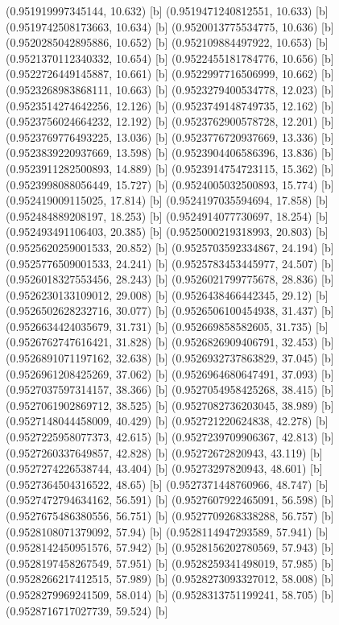 {{{(0.951919997345144, 10.632) [b] 
(0.9519471240812551, 10.633) [b] 
(0.9519742508173663, 10.634) [b] 
(0.9520013775534775, 10.636) [b] 
(0.9520285042895886, 10.652) [b] 
(0.952109884497922, 10.653) [b] 
(0.9521370112340332, 10.654) [b] 
(0.9522455181784776, 10.656) [b] 
(0.9522726449145887, 10.661) [b] 
(0.9522997716506999, 10.662) [b] 
(0.9523268983868111, 10.663) [b] 
(0.9523279400534778, 12.023) [b] 
(0.9523514274642256, 12.126) [b] 
(0.9523749148749735, 12.162) [b] 
(0.9523756024664232, 12.192) [b] 
(0.9523762900578728, 12.201) [b] 
(0.9523769776493225, 13.036) [b] 
(0.9523776720937669, 13.336) [b] 
(0.9523839220937669, 13.598) [b] 
(0.9523904406586396, 13.836) [b] 
(0.9523911282500893, 14.889) [b] 
(0.9523914754723115, 15.362) [b] 
(0.9523998088056449, 15.727) [b] 
(0.9524005032500893, 15.774) [b] 
(0.952419009115025, 17.814) [b] 
(0.9524197035594694, 17.858) [b] 
(0.952484889208197, 18.253) [b] 
(0.9524914077730697, 18.254) [b] 
(0.952493491106403, 20.385) [b] 
(0.9525000219318993, 20.803) [b] 
(0.9525620259001533, 20.852) [b] 
(0.9525703592334867, 24.194) [b] 
(0.9525776509001533, 24.241) [b] 
(0.9525783453445977, 24.507) [b] 
(0.9526018327553456, 28.243) [b] 
(0.9526021799775678, 28.836) [b] 
(0.9526230133109012, 29.008) [b] 
(0.9526438466442345, 29.12) [b] 
(0.9526502628232716, 30.077) [b] 
(0.9526506100454938, 31.437) [b] 
(0.9526634424035679, 31.731) [b] 
(0.952669858582605, 31.735) [b] 
(0.9526762747616421, 31.828) [b] 
(0.9526826909406791, 32.453) [b] 
(0.9526891071197162, 32.638) [b] 
(0.9526932737863829, 37.045) [b] 
(0.9526961208425269, 37.062) [b] 
(0.9526964680647491, 37.093) [b] 
(0.9527037597314157, 38.366) [b] 
(0.9527054958425268, 38.415) [b] 
(0.9527061902869712, 38.525) [b] 
(0.9527082736203045, 38.989) [b] 
(0.9527148044458009, 40.429) [b] 
(0.952721220624838, 42.278) [b] 
(0.9527225958077373, 42.615) [b] 
(0.9527239709906367, 42.813) [b] 
(0.9527260337649857, 42.828) [b] 
(0.95272672820943, 43.119) [b] 
(0.9527274226538744, 43.404) [b] 
(0.95273297820943, 48.601) [b] 
(0.9527364504316522, 48.65) [b] 
(0.9527371448760966, 48.747) [b] 
(0.9527472794634162, 56.591) [b] 
(0.9527607922465091, 56.598) [b] 
(0.9527675486380556, 56.751) [b] 
(0.9527709268338288, 56.757) [b] 
(0.9528108071379092, 57.94) [b] 
(0.9528114947293589, 57.941) [b] 
(0.9528142450951576, 57.942) [b] 
(0.9528156202780569, 57.943) [b] 
(0.9528197458267549, 57.951) [b] 
(0.9528259341498019, 57.985) [b] 
(0.9528266217412515, 57.989) [b] 
(0.9528273093327012, 58.008) [b] 
(0.9528279969241509, 58.014) [b] 
(0.9528313751199241, 58.705) [b] 
(0.9528716717027739, 59.524) [b] 
}}}
